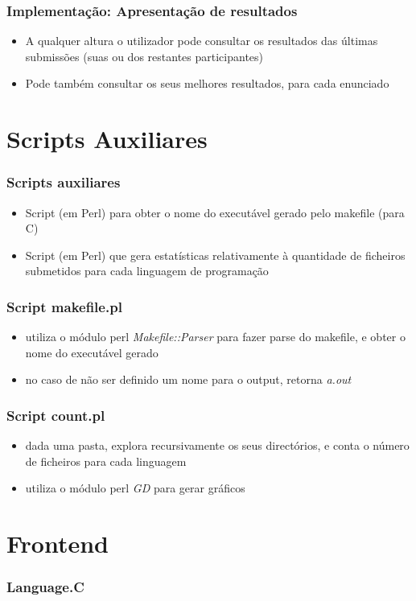 \documentclass{beamer}
\begin{document}
\begin{frame} \frametitle{Implementação: Apresentação de resultados}
\begin{itemize}
\item A qualquer altura o utilizador pode consultar os resultados das últimas submissões (suas ou dos restantes 
participantes)
\item Pode também consultar os seus melhores resultados, para cada enunciado
\end{itemize}
\end{frame}

\section{Scripts Auxiliares}
\begin{frame} \frametitle{Scripts auxiliares}
\begin{itemize} 
\item Script (em Perl) para obter o nome do executável gerado pelo makefile (para C)
\item Script (em Perl) que gera estatísticas relativamente à quantidade de ficheiros submetidos para cada linguagem de programação
\end{itemize}
\end{frame}

\begin{frame} \frametitle{Script makefile.pl}
\begin{itemize} 
\item utiliza o módulo perl \textit{Makefile::Parser} para fazer parse do makefile, e obter o nome do executável gerado
\item no caso de não ser definido um nome para o output, retorna \textit{a.out}
\end{itemize}
\end{frame}

\begin{frame} \frametitle{Script count.pl}
\begin{itemize} 
\item dada uma pasta, explora recursivamente os seus directórios, e conta o número de ficheiros para cada linguagem
\item utiliza o módulo perl \textit{GD} para gerar gráficos
\end{itemize}
\end{frame}

\section{Frontend}
\begin{frame} \frametitle{Language.C}
\end{frame}
\end{document}
